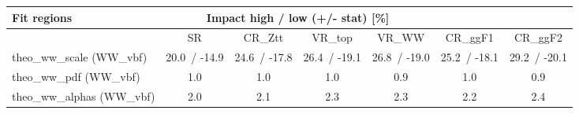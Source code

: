 \begin{tabular}{ l || c  c  c  c  c  c }
Fit regions & \multicolumn{4}{||c}{Impact high / low (+/- stat) [\%]} &  & \tabularnewline
\hline
 & SR & CR\_Ztt & VR\_top & VR\_WW & CR\_ggF1 & CR\_ggF2 \tabularnewline
\hline
theo\_ww\_scale (WW\_vbf) & 20.0\, / -14.9 & 24.6\, / -17.8 & 26.4\, / -19.1 & 26.8\, / -19.0 & 25.2\, / -18.1 & 29.2\, / -20.1\tabularnewline
theo\_ww\_pdf (WW\_vbf) & 1.0 & 1.0 & 1.0 & 0.9 & 1.0 & 0.9\tabularnewline
theo\_ww\_alphas (WW\_vbf) & 2.0 & 2.1 & 2.3 & 2.3 & 2.2 & 2.4
\end{tabular}
